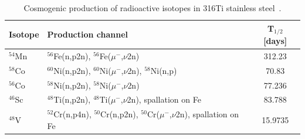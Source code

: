 
\begin{table}[!h]
\centering
\caption[Cosmogenic production of radioactive isotopes in 316Ti stainless steel]{Cosmogenic production of radioactive isotopes in 316Ti stainless steel~\cite{SteelCosmogenics}.}
\label{tabSteelCosmogenics1}
\begin{tabular}{>{\footnotesize}l|>{\footnotesize}l|>{\footnotesize}c}
\hline
Isotope				& Production channel													& T$_{1/2}$ [days]	 \\
\hline
$^{54}$Mn			& $^{56}$Fe(n,p2n), $^{56}$Fe($\mu^{-}$,$\nu$2n)								& 312.23 \\
$^{58}$Co 			& $^{60}$Ni(n,p2n), $^{60}$Ni($\mu^{-}$,$\nu$2n), $^{58}$Ni(n,p) 					& 70.83 \\
$^{56}$Co 			& $^{58}$Ni(n,p2n), $^{58}$Ni($\mu^{-}$,$\nu$2n) 								& 77.236 \\
$^{46}$Sc 			& $^{48}$Ti(n,p2n), $^{48}$Ti($\mu^{-}$,$\nu$2n), spallation on Fe 					& 83.788 \\
$^{48}$V 				& $^{52}$Cr(n,p4n), $^{50}$Cr(n,p2n), $^{50}$Cr($\mu^{-}$,$\nu$2n), spallation on Fe 	& 15.9735 \\
\hline
\end{tabular}
\end{table}


